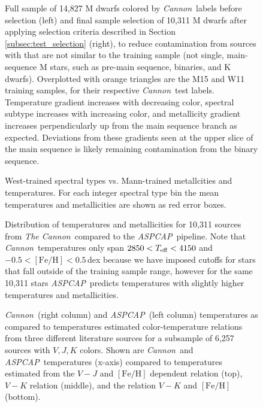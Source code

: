 \documentclass[modern]{aastex62}
\newcommand{\thecannon}{\textsl{The Cannon}}
\newcommand{\cannon}{\textsl{Cannon}}
\newcommand{\aspcap}{\textsl{ASPCAP}}
\newcommand{\feh}{[{\mathrm{Fe}/\mathrm{H}}]}
\begin{document}
\begin{figure}[ht]
	\caption{Full sample of 14,827 M dwarfs colored by \cannon\ labels before selection (left) and final sample selection of 10,311 M dwarfs after applying selection criteria described in Section \ref{subsec:test_selection} (right), to reduce contamination from sources with that are not similar to the training sample (not single, main-sequence M stars, such as pre-main sequence, binaries, and K dwarfs). Overplotted with orange triangles are the M15 and W11 training samples, for their respective \cannon\ test labels. Temperature gradient increases with decreasing color, spectral subtype increases with increasing color, and metallicity gradient increases perpendicularly up from the main sequence branch as expected. Deviations from these gradients seen at the upper slice of the main sequence is likely remaining contamination from the binary sequence. \label{fig:safe_selection}}
\end{figure}

\begin{figure}[ht]
	\caption{West-trained spectral types vs. Mann-trained metallcities and temperatures. For each integer spectral type bin the mean temperatures and metallicities are shown as red error boxes. \label{fig:west_vs_mann}}
\end{figure}

\begin{figure}[ht]
	\caption{Distribution of temperatures and metallicities for 10,311 sources from \thecannon\ compared to the \aspcap\ pipeline. Note that \cannon\ temperatures only span $2850<T_{\rm eff}<4150$ and $-0.5<\feh<0.5$\,dex because we have imposed cutoffs for stars that fall outside of the training sample range, however for the same 10,311 stars \aspcap\ predicts temperatures with slightly higher temperatures and metallicities. \label{fig:aspcap_cannon_label_hist}} 
\end{figure}

\begin{figure}[ht]
	\caption{\cannon\ (right column) and \aspcap\ (left column) temperatures as compared to temperatures estimated color-temperature relations from three different literature sources for a subsample of 6,257 sources with $V,J,K$ colors. Shown are \cannon\ and \aspcap\ temperatures (x-axis) compared to temperatures estimated from the \citealt{Mann:2015} $V-J$ and $\feh$ dependent relation (top), \citealt{Casagrande:2008} $V-K$ relation (middle), and the \citealt{Boyajian:2012} relation $V-K$ and $\feh$ (bottom).  \label{fig:teff_comparisons}}
\end{figure}
\end{document}
